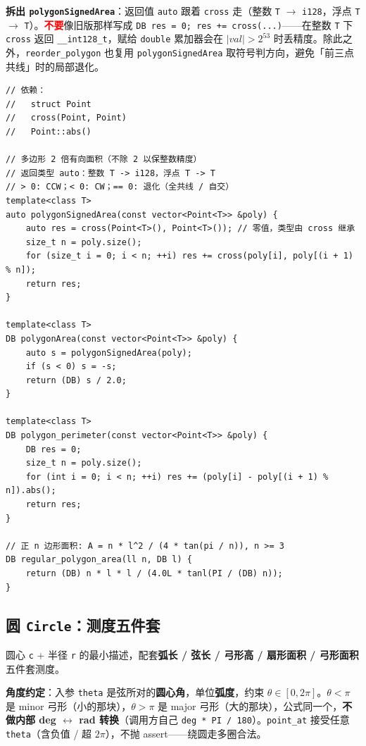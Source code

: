 		\textbf{拆出 \texttt{polygonSignedArea}}：返回值 \texttt{auto} 跟着 \texttt{cross} 走（整数 \texttt{T} $\to$ \texttt{i128}，浮点 \texttt{T} $\to$ \texttt{T}）。\textcolor{red}{\textbf{不要}}像旧版那样写成 \texttt{DB res = 0; res += cross(...)}——在整数 \texttt{T} 下 \texttt{cross} 返回 \texttt{\_\_int128\_t}，赋给 \texttt{double} 累加器会在 $|val| > 2^{53}$ 时丢精度。除此之外，\texttt{reorder\_polygon} 也复用 \texttt{polygonSignedArea} 取符号判方向，避免「前三点共线」时的局部退化。

		\begin{verbatim}
// 依赖：
//   struct Point
//   cross(Point, Point)
//   Point::abs()

// 多边形 2 倍有向面积（不除 2 以保整数精度）
// 返回类型 auto：整数 T -> i128，浮点 T -> T
// > 0: CCW；< 0: CW；== 0: 退化（全共线 / 自交）
template<class T>
auto polygonSignedArea(const vector<Point<T>> &poly) {
	auto res = cross(Point<T>(), Point<T>()); // 零值，类型由 cross 继承
	size_t n = poly.size();
	for (size_t i = 0; i < n; ++i) res += cross(poly[i], poly[(i + 1) % n]);
	return res;
}

template<class T>
DB polygonArea(const vector<Point<T>> &poly) {
	auto s = polygonSignedArea(poly);
	if (s < 0) s = -s;
	return (DB) s / 2.0;
}

template<class T>
DB polygon_perimeter(const vector<Point<T>> &poly) {
	DB res = 0;
	size_t n = poly.size();
	for (int i = 0; i < n; ++i) res += (poly[i] - poly[(i + 1) % n]).abs();
	return res;
}

// 正 n 边形面积: A = n * l^2 / (4 * tan(pi / n)), n >= 3
DB regular_polygon_area(ll n, DB l) {
	return (DB) n * l * l / (4.0L * tanl(PI / (DB) n));
}
		\end{verbatim}

		\subsection{圆 \texttt{Circle}：测度五件套}

		圆心 \texttt{c} + 半径 \texttt{r} 的最小描述，配套\textbf{弧长 / 弦长 / 弓形高 / 扇形面积 / 弓形面积}五件套测度。

		\textbf{角度约定}：入参 \texttt{theta} 是弦所对的\textbf{圆心角}，单位\textbf{弧度}，约束 $\theta \in [0, 2\pi]$。$\theta < \pi$ 是 minor 弓形（小的那块），$\theta > \pi$ 是 major 弓形（大的那块），公式同一个，\textbf{不做内部 deg $\leftrightarrow$ rad 转换}（调用方自己 \texttt{deg * PI / 180}）。\texttt{point\_at} 接受任意 \texttt{theta}（含负值 / 超 $2\pi$），不抛 assert——绕圆走多圈合法。

